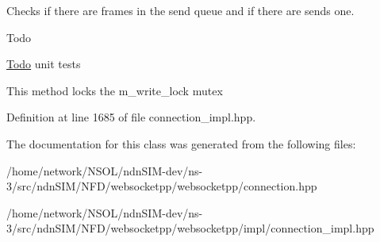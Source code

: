 Checks if there are frames in the send queue and if there are sends one. 

\begin{DoxyRefDesc}{Todo}
\item[\hyperlink{todo__todo000031}{Todo}]unit tests\end{DoxyRefDesc}


This method locks the m\+\_\+write\+\_\+lock mutex 

Definition at line 1685 of file connection\+\_\+impl.\+hpp.



The documentation for this class was generated from the following files\+:\begin{DoxyCompactItemize}
\item 
/home/network/\+N\+S\+O\+L/ndn\+S\+I\+M-\/dev/ns-\/3/src/ndn\+S\+I\+M/\+N\+F\+D/websocketpp/websocketpp/connection.\+hpp\item 
/home/network/\+N\+S\+O\+L/ndn\+S\+I\+M-\/dev/ns-\/3/src/ndn\+S\+I\+M/\+N\+F\+D/websocketpp/websocketpp/impl/connection\+\_\+impl.\+hpp\end{DoxyCompactItemize}
